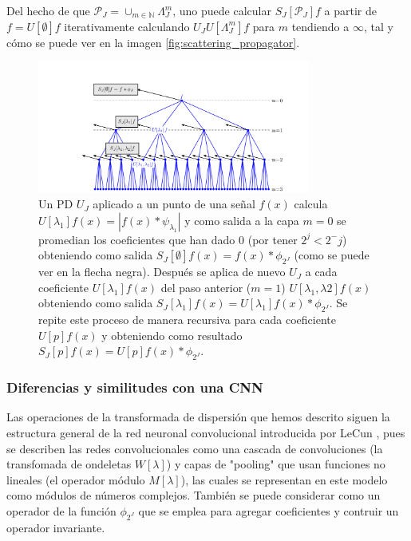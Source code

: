 \noindent Del hecho de que $\mathcal{P}_J=\cup_{m\in \mathbb{N}}\Lambda_J^m$, uno puede calcular $S_J[\mathcal{P}_J]f$ a partir de $f=U[\emptyset]f$ iterativamente calculando $U_J U[\Lambda_J^m]f$ para $m$ tendiendo a $\infty$, tal y cómo se puede ver en la imagen \autoref{fig:scattering_propagator}. 

\begin{figure} [!h]
  \centering
  \includegraphics[width=0.8\textwidth]{img/ScatteringPropagator.png}
  \caption{Un PD $U_J$ aplicado a un punto de una señal $f(x)$ calcula $U[\lambda_1]f(x)=|f(x)\ast \psi_{\lambda_1}|$ y como salida a la capa $m=0$ se promedian los coeficientes que han dado $0$ (por tener $2^j<2^-j$) obteniendo como salida $S_J[\emptyset]f(x)=f(x)\ast \phi_{2^J}$ (como se puede ver en la flecha negra). Después se aplica de nuevo $U_J$ a cada coeficiente $U[\lambda_1]f(x)$ del paso anterior ($m=1$) $U[\lambda_1,\lambda2]f(x)$ obteniendo como salida $S_J[\lambda_1]f(x)=U[\lambda_1]f(x) \ast \phi_{2^J}$. Se repite este proceso de manera recursiva para cada coeficiente $U[p]f(x)$ y obteniendo como resultado $S_J[p]f(x)=U[p]f(x) \ast \phi_{2^J}$. }
  \label{fig:scattering_propagator}
\end{figure}


\subsubsection{Diferencias y similitudes con una CNN}


Las operaciones de la transformada de dispersión que hemos descrito siguen la estructura general de la red neuronal convolucional introducida por LeCun \cite{lecun2015deep}, pues se describen las redes convolucionales como una cascada de convoluciones (la transfomada de ondeletas $W[\lambda]$) y capas de "pooling" que usan funciones no lineales (el operador módulo $M[\lambda]$), las cuales se representan en este modelo como módulos de números complejos. También se puede considerar como un operador de  la función $\phi_{2^J}$ que se emplea para agregar coeficientes y contruir un operador invariante.

